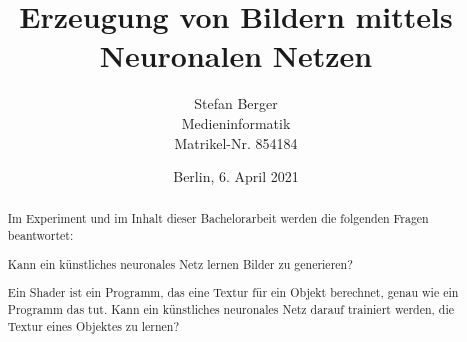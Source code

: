 \titlehead{Berliner Hochschule für Technik Berlin\\Fachbereich VI -- Informatik und Medien}
\subject{Bachelorarbeit}
\title{Erzeugung von Bildern mittels Neuronalen Netzen}
\author{Stefan Berger\\Medieninformatik\\Matrikel-Nr. 854184}
\date{Berlin, 6. April 2021}

\publishers{Betreut von: Prof.~Dr.~F.~Gers \\ \bigskip Gutachter: Prof.~Dr.~J.~Schimkat}


\maketitle

\begin{abstract}
\vspace{\baselineskip}
Im Experiment und im Inhalt dieser Bachelorarbeit werden die folgenden Fragen beantwortet:

\noindent Kann ein künstliches neuronales Netz lernen Bilder zu generieren?

\noindent Ein Shader ist ein Programm, das eine Textur für ein Objekt berechnet, genau wie ein Programm das tut. Kann ein künstliches neuronales Netz darauf trainiert werden, die Textur eines Objektes zu lernen?
\end{abstract}

